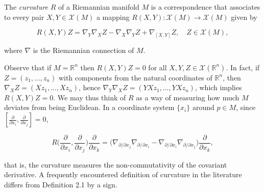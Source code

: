 \begin{definition}[curvature]
  \label{def:dc-ch4-2-1}
  \leanok
  The \emph{curvature} $R$ of a Riemannian manifold $M$ is a correspondence that
  associates to every pair $X,Y\in\mathcal{X}(M)$ a mapping
  $R(X,Y):\mathcal{X}(M)\to\mathcal{X}(M)$ given by
  
  $$
  R(X,Y)Z=\nabla_Y\nabla_X Z-\nabla_X\nabla_Y Z+\nabla_{[X,Y]}Z,\quad Z\in\mathcal{X}(M),
  $$
  
  where $\nabla$ is the Riemannian connection of $M$.
  
  Observe that if $M=\mathbb{R}^n$ then $R(X,Y)Z=0$ for all
  $X,Y,Z\in\mathcal{X}(\mathbb{R}^n)$. In fact, if $Z=(z_1,\dots,z_n)$ with
  components from the natural coordinates of $\mathbb{R}^n$, then
  $\nabla_X Z=(Xz_1,\dots,Xz_n)$, hence
  $\nabla_Y\nabla_X Z=(YXz_1,\dots,YXz_n)$, which implies $R(X,Y)Z=0$. We may thus
  think of $R$ as a way of measuring how much $M$ deviates from being Euclidean.
  In a coordinate system $\{x_i\}$ around $p\in M$, since
  $[\frac{\partial}{\partial x_i},\frac{\partial}{\partial x_j}]=0$,
  
  $$
  R\Big(\frac{\partial}{\partial x_i},\frac{\partial}{\partial x_j}\Big)\frac{\partial}{\partial x_k}=\Big(\nabla_{\partial/\partial x_j}\nabla_{\partial/\partial x_i}-\nabla_{\partial/\partial x_i}\nabla_{\partial/\partial x_j}\Big)\frac{\partial}{\partial x_k},
  $$
  
  that is, the curvature measures the non-commutativity of the covariant
  derivative. A frequently encountered definition of curvature in the literature
  differs from Definition 2.1 by a sign.
\end{definition}

